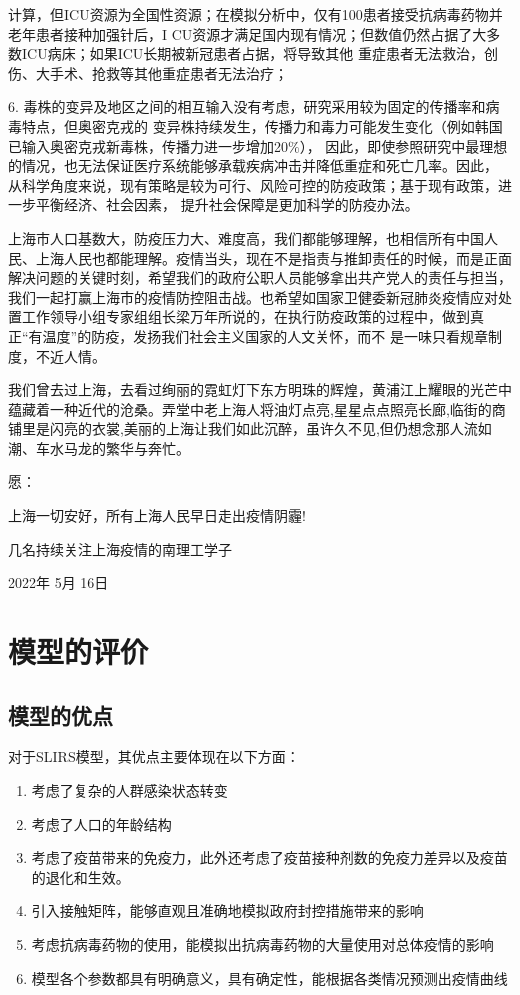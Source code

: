 \documentclass[bwprint]{gmcmthesis}
\numberwithin{figure}{section}
\begin{document}
计算，但ICU资源为全国性资源；在模拟分析中，仅有100患者接受抗病毒药物并老年患者接种加强针后，I
CU资源才满足国内现有情况；但数值仍然占据了大多数ICU病床；如果ICU长期被新冠患者占据，将导致其他
重症患者无法救治，创伤、大手术、抢救等其他重症患者无法治疗；
\par 6. 毒株的变异及地区之间的相互输入没有考虑，研究采用较为固定的传播率和病毒特点，但奥密克戎的
变异株持续发生，传播力和毒力可能发生变化（例如韩国已输入奥密克戎新毒株，传播力进一步增加20$\%$），
因此，即使参照研究中最理想的情况，也无法保证医疗系统能够承载疾病冲击并降低重症和死亡几率。因此，
从科学角度来说，现有策略是较为可行、风险可控的防疫政策；基于现有政策，进一步平衡经济、社会因素，
提升社会保障是更加科学的防疫办法。
\par 上海市人口基数大，防疫压力大、难度高，我们都能够理解，也相信所有中国人民、上海人民也都能理解。疫情当头，现在不是指责与推卸责任的时候，而是正面解决问题的关键时刻，希望我们的政府公职人员能够拿出共产党人的责任与担当，我们一起打赢上海市的疫情防控阻击战。也希望如国家卫健委新冠肺炎疫情应对处置工作领导小组专家组组长梁万年所说的，在执行防疫政策的过程中，做到真正“有温度”的防疫，发扬我们社会主义国家的人文关怀，而不
是一味只看规章制度，不近人情。
\par 我们曾去过上海，去看过绚丽的霓虹灯下东方明珠的辉煌，黄浦江上耀眼的光芒中蕴藏着一种近代的沧桑。弄堂中老上海人将油灯点亮,星星点点照亮长廊,临街的商铺里是闪亮的衣裳,美丽的上海让我们如此沉醉，虽许久不见,但仍想念那人流如潮、车水马龙的繁华与奔忙。
\\
\par 愿：
\begin{flushleft}
    上海一切安好，所有上海人民早日走出疫情阴霾!
\end{flushleft}
\begin{flushright}
    几名持续关注上海疫情的南理工学子
    \par 2022年 5月 16日
\end{flushright}

\section{模型的评价}
\subsection{模型的优点}
\par 对于SLIRS模型，其优点主要体现在以下方面：
\begin{enumerate}
  \item 考虑了复杂的人群感染状态转变
  \item 考虑了人口的年龄结构
  \item 考虑了疫苗带来的免疫力，此外还考虑了疫苗接种剂数的免疫力差异以及疫苗的退化和生效。
  \item 引入接触矩阵，能够直观且准确地模拟政府封控措施带来的影响
  \item 考虑抗病毒药物的使用，能模拟出抗病毒药物的大量使用对总体疫情的影响
  \item 模型各个参数都具有明确意义，具有确定性，能根据各类情况预测出疫情曲线
  \end{enumerate}
\end{document}
